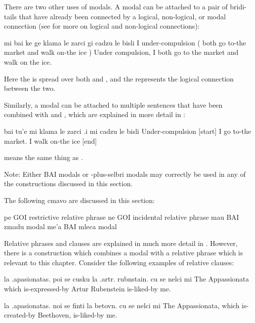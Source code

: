 There are two other uses of modals. A modal can
    be attached to a pair of bridi-tails that have already been
    connected by a logical, non-logical, or modal connection (see for more on logical and
    non-logical connections):
\begin{example}
mi bai\n
\T	ke ge klama le zarci gi cadzu le bisli \n
I under-compulsion\n
\T	( both go to-the market and walk on-the ice )\n
Under compulsion, I both go to the market\n
\T	and walk on the ice.
\end{example}

Here the  is spread over both  and
    , and the  represents the
    logical connection  between the two.

 Similarly, a modal can be attached to multiple sentences that
    have been combined with  and , which are explained
    in more detail in :
\begin{example}
bai tu'e mi klama le zarci\n
\T	.i mi cadzu le bisli \n
Under-compulsion [start] I go to-the market.\n
\T	I walk on-the ice [end]
\end{example}

{\noindent}means the same thing as . 

Note: Either BAI modals or -plus-selbri modals may
    correctly be used in any of the constructions discussed in this
    section.



The following cmavo are discussed in this section:

   pe  GOI restrictive relative phrase
    ne  GOI incidental relative phrase
    mau BAI zmadu modal
    me'a    BAI mleca modal

Relative phrases and clauses are explained in much more
    detail in . However, there is
    a construction which combines a modal with a relative phrase
    which is relevant to this chapter. Consider the following
    examples of relative clauses:
\begin{example}
la .apasionatas. poi se cusku la .artr. rubnstain.\n
\T	cu se nelci mi\n
The Appassionata which is-expressed-by Artur Rubenstein\n
\T	is-liked-by me.
\end{example}

\begin{example}
la .apasionatas. noi se finti la betovn.\n
\T	cu se nelci mi\n
The Appassionata, which is-created-by Beethoven,\n
\T	is-liked-by me.
\end{example}

